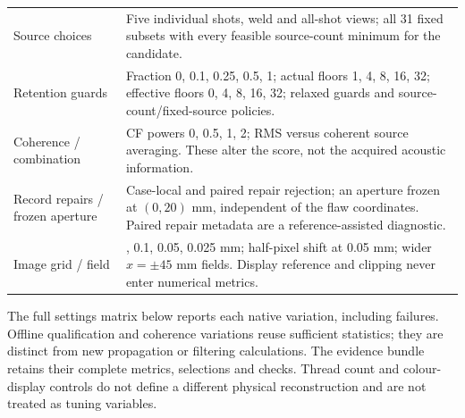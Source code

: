 \documentclass[11pt]{article}
\begin{document}
\begin{longtable}{@{}>{\raggedright\arraybackslash}p{.27\linewidth}>{\raggedright\arraybackslash}p{.67\linewidth}@{}}
Source choices & Five individual shots, weld and all-shot views; all 31 fixed subsets with every feasible source-count minimum for the candidate.\\
Retention guards & Fraction 0, 0.1, 0.25, 0.5, 1; actual floors 1, 4, 8, 16, 32; effective floors 0, 4, 8, 16, 32; relaxed guards and source-count/fixed-source policies.\\
Coherence / combination & CF powers 0, 0.5, 1, 2; RMS versus coherent source averaging. These alter the score, not the acquired acoustic information.\\
Record repairs / frozen aperture & Case-local and paired repair rejection; an aperture frozen at $(0,20)$ mm, independent of the flaw coordinates. Paired repair metadata are a reference-assisted diagnostic.\\
Image grid / field & 0.2, 0.1, 0.05, 0.025 mm; half-pixel shift at 0.05 mm; wider $x=\pm45$ mm fields. Display reference and clipping never enter numerical metrics.\\
\bottomrule
\end{longtable}

The full settings matrix below reports each native variation, including failures. Offline qualification and coherence variations reuse sufficient statistics; they are distinct from new propagation or filtering calculations. The evidence bundle retains their complete metrics, selections and checks. Thread count and colour-display controls do not define a different physical reconstruction and are not treated as tuning variables.
\end{document}
